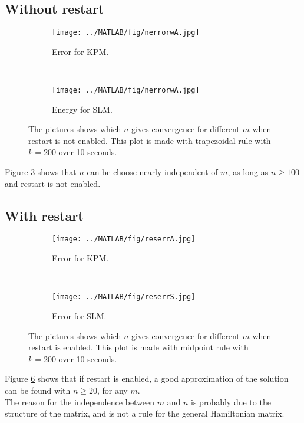\subsection{Without restart} %
\begin{figure}[H]
        \centering
        \begin{subfigure}[b]{0.45\textwidth}
                \texttt{[image: ../MATLAB/fig/nerrorwA.jpg]}
                \caption{ Error for KPM. }
                \label{fig:nerrorw}
        \end{subfigure}
        ~
        \begin{subfigure}[b]{0.45\textwidth}
                \texttt{[image: ../MATLAB/fig/nerrorwA.jpg]}
                \caption{ Energy for SLM. \\ }
                \label{fig:nenergyw}
        \end{subfigure}
        \caption{ The pictures shows which $n$ gives convergence for different $m$ when restart is not enabled. This plot is made with trapezoidal rule with $k = 200$ over 10 seconds. }
        \label{fig:n}
\end{figure}
Figure \ref{fig:n} shows that $n$ can be choose nearly independent of $m$, as long as $n \geq 100$ and restart is not enabled.

\subsection{With restart} %

\begin{figure}[H]
        \centering
        \begin{subfigure}[b]{0.45\textwidth}
                \texttt{[image: ../MATLAB/fig/reserrA.jpg]}
                \caption{ Error for KPM. }
                \label{fig:reserrS}
        \end{subfigure}
		~
		\begin{subfigure}[b]{0.45\textwidth}
                \texttt{[image: ../MATLAB/fig/reserrS.jpg]}
                \caption{ Error for SLM. }
                \label{fig:reseneA}
        \end{subfigure}
        \caption{ The pictures shows which $n$ gives convergence for different $m$ when restart is enabled. This plot is made with midpoint rule with $k = 200$ over 10 seconds. }
        \label{fig:res}

\end{figure}
Figure \ref{fig:res} shows that if restart is enabled, a good approximation of the solution can be found with $n \geq 20$, for any $m$.\\
The reason for the independence between $m$ and $n$ is probably due to the structure of the matrix, and is not a rule for the general Hamiltonian matrix.

